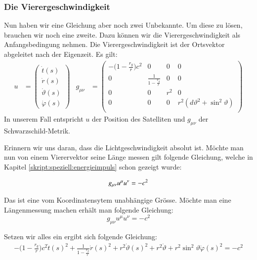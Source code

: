\begin{refsection}
\subsubsection{Die Vierergeschwindigkeit}
Nun haben wir eine Gleichung aber noch zwei Unbekannte. Um diese zu lösen, brauchen wir noch eine zweite. Dazu können wir die Vierergeschwindigkeit als Anfangsbedingung nehmen. Die Vierergeschwindigkeit ist der Ortsvektor abgeleitet nach der Eigenzeit. Es gilt:
\begin{align*}
u &= 
\begin{pmatrix}
\dot t(s) \\
\dot r(s) \\
\dot \vartheta (s) \\
\dot \varphi (s)
\end{pmatrix} &
g_{\mu\nu} &= 
\begin{pmatrix}
-\biggl(1-\frac{r_g}r\biggr)c^2 & 0 & 0 & 0 \\
0 & \frac1{\displaystyle 1-\frac{r_g}r} & 0 & 0 \\
0 & 0 &  r^2 & 0 \\
0 & 0 & 0 &  r^2(d\vartheta^2 + \sin^2\vartheta) \\
\end{pmatrix}
\end{align*}
In unserem Fall entspricht \( u \) der Position des Satelliten und \( g_{\mu\nu} \) der Schwarzschild-Metrik. 

Erinnern wir uns daran, dass die Lichtgeschwindigkeit absolut ist. Möchte man nun von einem Vierervektor seine Länge messen gilt folgende Gleichung, welche in Kapitel \ref{skript:speziell:energieimpuls} schon gezeigt wurde:

\begin{equation}
g_{\mu\nu}u^\mu u^\nu=-c^2 \\
\end{equation}

\noindent{}Das ist eine vom Koordinatensytem unabhängige Grösse. Möchte man eine Längenmessung machen erhält man folgende Gleichung: \\

\begin{equation}
g_{\mu\nu}u^\mu u^\nu = -c^2
\end{equation}

\noindent{}Setzen wir alles ein ergibt sich folgende Gleichung:
\begin{align*}
-\biggl(1-\frac{r_g}r\biggr)c^2 \dot t(s)^2 +  \frac1{\displaystyle 1-\frac{r_g}r} \dot r(s)^2 + r^2 \dot \vartheta(s)^2 + r^2 \dot \vartheta + r^2 \sin^2 \vartheta \dot \varphi (s)^2 = -c^2
\end{align*}


\end{refsection}
